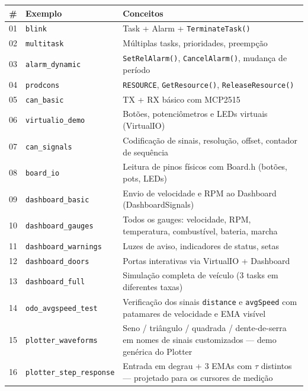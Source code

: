 \documentclass[12pt,a4paper]{article}
\begin{document}
\begin{center}
\small
\begin{tabularx}{\textwidth}{clX}
  \toprule
  \textbf{\#} & \textbf{Exemplo} & \textbf{Conceitos} \\
  \midrule
  01 & \texttt{blink} & Task + Alarm + \texttt{TerminateTask()} \\
  02 & \texttt{multitask} & Múltiplas tasks, prioridades, preempção \\
  03 & \texttt{alarm\_dynamic} & \texttt{SetRelAlarm()}, \texttt{CancelAlarm()}, mudança de período \\
  04 & \texttt{prodcons} & \texttt{RESOURCE}, \texttt{GetResource()}, \texttt{ReleaseResource()} \\
  05 & \texttt{can\_basic} & TX + RX básico com MCP2515 \\
  06 & \texttt{virtualio\_demo} & Botões, potenciômetros e LEDs virtuais (VirtualIO) \\
  07 & \texttt{can\_signals} & Codificação de sinais, resolução, offset, contador de sequência \\
  08 & \texttt{board\_io} & Leitura de pinos físicos com Board.h (botões, pots, LEDs) \\
  \midrule
  09 & \texttt{dashboard\_basic} & Envio de velocidade e RPM ao Dashboard (DashboardSignals) \\
  10 & \texttt{dashboard\_gauges} & Todos os gauges: velocidade, RPM, temperatura, combustível, bateria, marcha \\
  11 & \texttt{dashboard\_warnings} & Luzes de aviso, indicadores de status, setas \\
  12 & \texttt{dashboard\_doors} & Portas interativas via VirtualIO + Dashboard \\
  13 & \texttt{dashboard\_full} & Simulação completa de veículo (3 tasks em diferentes taxas) \\
  14 & \texttt{odo\_avgspeed\_test} & Verificação dos sinais \texttt{distance} e \texttt{avgSpeed} com patamares de velocidade e EMA visível \\
  \midrule
  15 & \texttt{plotter\_waveforms} & Seno / triângulo / quadrada / dente-de-serra em nomes de sinais customizados --- demo genérica do Plotter \\
  16 & \texttt{plotter\_step\_response} & Entrada em degrau + 3 EMAs com $\tau$ distintos --- projetado para os cursores de medição \\
  \bottomrule
\end{tabularx}
\end{center}
\end{document}
